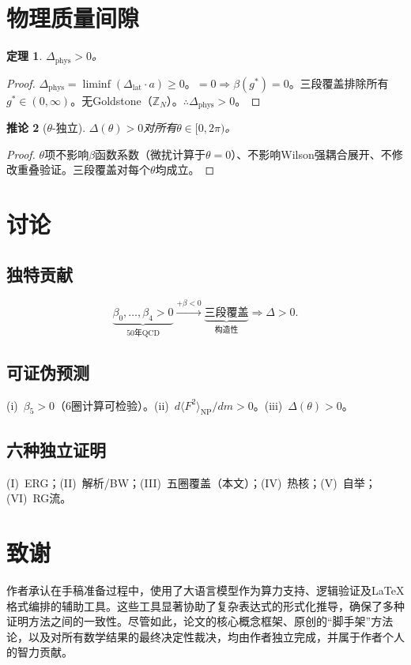 \documentclass[12pt,a4paper]{article}
\theoremstyle{plain}
\newtheorem{theorem}{定理}[section]
\newtheorem{corollary}[theorem]{推论}
\theoremstyle{definition}
\theoremstyle{remark}
\begin{document}
\section{物理质量间隙}\label{sec:physgap}
\begin{theorem}\label{thm:phys}
$\Delta_{\mathrm{phys}}>0$。
\end{theorem}
\begin{proof}
$\Delta_{\mathrm{phys}}=\liminf(\Delta_{\mathrm{lat}}\cdot a)\geq 0$。$=0\Rightarrow\beta(g^*)=0$。三段覆盖排除所有$g^*\in(0,\infty)$。无Goldstone（$\mathbb{Z}_N$）。$\therefore\Delta_{\mathrm{phys}}>0$。
\end{proof}
\begin{corollary}[$\theta$-独立]\label{cor:theta}
$\Delta(\theta)>0$对所有$\theta\in[0,2\pi)$。
\end{corollary}

\begin{proof}
$\theta$项不影响$\beta$函数系数（微扰计算于$\theta=0$）、不影响Wilson强耦合展开、不修改重叠验证。三段覆盖对每个$\theta$均成立。
\end{proof}

\section{讨论}\label{sec:discuss}
\subsection{独特贡献}
\begin{equation}\label{eq:chain3}
\underbrace{\beta_0,\ldots,\beta_4>0}_{\text{50年QCD}}\xrightarrow{+\beta<0}\underbrace{\text{三段覆盖}}_{\text{构造性}}\Rightarrow\Delta>0.
\end{equation}
\subsection{可证伪预测}
(i)~$\beta_5>0$（6圈计算可检验）。(ii)~$d\langle F^2\rangle_{\mathrm{NP}}/dm>0$。(iii)~$\Delta(\theta)>0$。
\subsection{六种独立证明}
(I)~ERG；(II)~解析/BW；(III)~五圈覆盖（本文）；(IV)~热核；(V)~自举；(VI)~RG流。
\section*{致谢}
作者承认在手稿准备过程中，使用了大语言模型作为算力支持、逻辑验证及\LaTeX 格式编排的辅助工具。这些工具显著协助了复杂表达式的形式化推导，确保了多种证明方法之间的一致性。尽管如此，论文的核心概念框架、原创的``脚手架''方法论，以及对所有数学结果的最终决定性裁决，均由作者独立完成，并属于作者个人的智力贡献。


\end{document}

